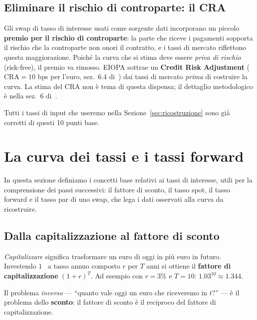 \documentclass[11pt,a4paper]{article}
\theoremstyle{plain}
\theoremstyle{definition}
\theoremstyle{remark}
\newcommand{\CRA}{\mathrm{CRA}}
\begin{document}
\subsection{Eliminare il rischio di controparte: il CRA}
\label{sec:cra}

Gli swap di tasso di interesse usati come sorgente dati incorporano un piccolo \textbf{premio
per il rischio di controparte}: la parte che riceve i pagamenti sopporta il rischio che la
controparte non onori il contratto, e i tassi di mercato riflettono questa maggiorazione.
Poich\'e la curva che si stima deve essere \emph{priva di rischio} (risk-free), il premio va
rimosso. EIOPA sottrae un \textbf{Credit Risk Adjustment} ($\CRA = 10$ bps per l'euro,
sez.~6.4 di~\cite{eiopa2026}) dai tassi di mercato \emph{prima} di costruire la curva.
La stima del $\CRA$ non \`e tema di questa dispensa; il dettaglio metodologico \`e
nella sez.~6 di~\cite{eiopa2026}.

Tutti i tassi di input che useremo nella Sezione~\ref{sec:ricostruzione} sono gi\`a corretti
di questi 10 punti base.

\section{La curva dei tassi e i tassi forward}
\label{sec:tassi}

In questa sezione definiamo i concetti base relativi ai tassi di interesse, utili per la
comprensione dei passi successivi: il fattore di sconto, il tasso spot, il tasso forward e il
tasso par di uno swap, che lega i dati osservati alla curva da ricostruire.

\subsection{Dalla capitalizzazione al fattore di sconto}

\emph{Capitalizzare} significa trasformare un euro di oggi in pi\`u euro in futuro. Investendo
$1$~\texteuro{} a tasso annuo composto $r$ per $T$ anni si ottiene il \textbf{fattore di
capitalizzazione} $(1+r)^T$. Ad esempio con $r=3\%$ e $T=10$: $1.03^{10}\approx 1.344$.

Il problema \emph{inverso} --- ``quanto vale oggi un euro che riceveremo in $t$?'' --- \`e il
problema dello \textbf{sconto}: il fattore di sconto \`e il reciproco del fattore di
capitalizzazione.
\end{document}
